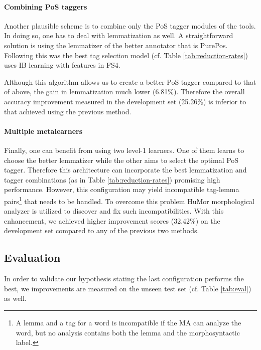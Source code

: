 \paragraph{Combining PoS taggers}

Another plausible scheme is to combine only the PoS tagger modules of the tools. 
In doing so, one has to deal with lemmatization as well. A straightforward solution is using the lemmatizer of the better annotator that is PurePos.
Following this was the best tag selection model (cf. Table \ref{tab:reduction-rates}) uses IB learning with features in FS4.

Although this algorithm allows us to create a better PoS tagger compared to that of above, the gain in lemmatization much lower (6.81\%). Therefore the overall accuracy improvement measured in the development set (25.26\%) is inferior to that achieved using the previous method.

\paragraph{Multiple metalearners}


Finally, one can benefit from using two level-1 learners. One of them learns to choose the better lemmatizer while the other aims to select the optimal PoS tagger. 
Therefore this architecture can incorporate the best lemmatization and tagger combinations (as in Table \ref{tab:reduction-rates}) promising high performance. However, this configuration may yield incompatible tag-lemma pairs\footnote{A lemma and a tag for a word is incompatible if the MA can analyze the word, but no analysis contains both the lemma and the morphosyntactic label.} that needs to be handled. To overcome this problem HuMor morphological analyzer is utilized to discover and fix such incompatibilities. 
With this enhancement, we achieved higher improvement scores (32.42\%) on the development set compared to any of the previous two methods.

\subsection{Evaluation}

In order to validate our hypothesis stating the last configuration performs the best, we improvements are measured on the unseen test set (cf. Table \ref{tab:eval}) as well.

